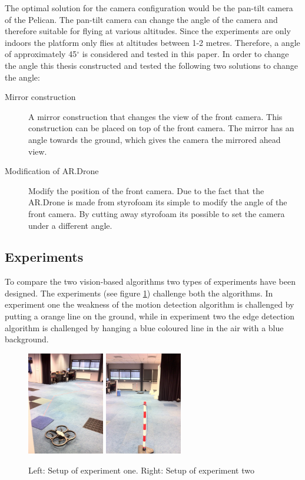 \documentclass[a4paper]{article}
\begin{document}
The optimal solution for the camera configuration would be the pan-tilt camera of the Pelican. The pan-tilt camera can change the angle of the camera and therefore suitable for flying at various altitudes. Since the experiments are only indoors the platform only flies at altitudes between 1-2 metres. Therefore, a angle of approximately 45$^{\circ}$ is considered and tested in this paper. In order to change the angle this thesis constructed and tested the following two solutions to change the angle:
\begin{description}
\item[Mirror construction] A mirror construction that changes the view of the front camera. This construction can be placed on top of the front camera. The mirror has an angle towards the ground, which gives the camera the mirrored ahead view.
\item[Modification of AR.Drone] Modify the position of the front camera. Due to the fact that the AR.Drone is made from styrofoam its simple to modify the angle of the front camera. By cutting away styrofoam its possible to set the camera under a different angle.
\end{description}

\subsection{Experiments}
To compare the two vision-based algorithms two types of experiments have been designed. The experiments (see figure \ref{experiments}) challenge both the algorithms. In experiment one the weakness of the motion detection algorithm is challenged by putting a orange line on the ground, while in experiment two the edge detection algorithm is challenged by hanging a blue coloured line in the air with a blue background.
\begin{figure}
\centering
\includegraphics[width=0.3\textwidth]{images/experiment1.jpg}
\includegraphics[width=0.3\textwidth]{images/experiment2.jpg}
\caption{Left: Setup of experiment one. Right: Setup of experiment two}
\label{experiments}
\end{figure}
\end{document}
